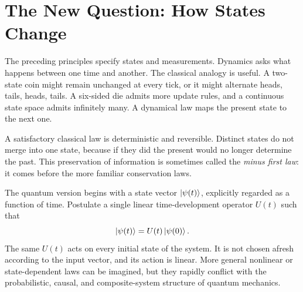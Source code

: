 \begin{classroomqa}
\end{classroomqa}

\begin{classroomqa}
\end{classroomqa}

\section{The New Question: How States Change}

The preceding principles specify states and measurements. Dynamics asks what happens between one time and another. The classical analogy is useful. A two-state coin might remain unchanged at every tick, or it might alternate heads, tails, heads, tails. A six-sided die admits more update rules, and a continuous state space admits infinitely many. A dynamical law maps the present state to the next one.

A satisfactory classical law is deterministic and reversible. Distinct states do not merge into one state, because if they did the present would no longer determine the past. This preservation of information is sometimes called the \emph{minus first law}: it comes before the more familiar conservation laws.

The quantum version begins with a state vector \(\left\lvert\psi(t)\right\rangle\), explicitly regarded as a function of time. Postulate a single linear time-development operator \(U(t)\) such that
\begin{equation}
\left\lvert\psi(t)\right\rangle=U(t)\left\lvert\psi(0)\right\rangle.
\label{eq:l4-time-development}
\end{equation}
The same \(U(t)\) acts on every initial state of the system. It is not chosen afresh according to the input vector, and its action is linear. More general nonlinear or state-dependent laws can be imagined, but they rapidly conflict with the probabilistic, causal, and composite-system structure of quantum mechanics.

